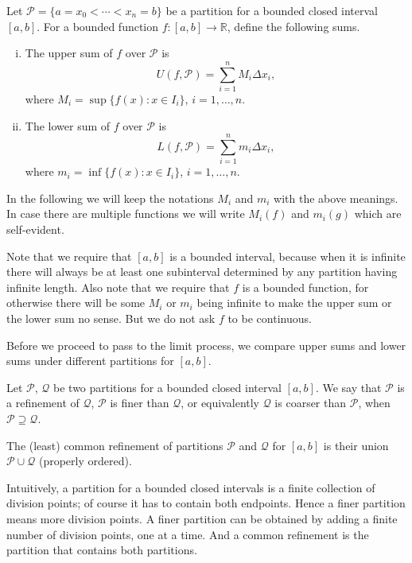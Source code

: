 \begin{defn}
  Let $\mathcal{P} = \{ a = x_0 < \cdots < x_n = b \}$ be a partition for a bounded closed interval $[a,b]$.
  For a bounded function $f: [a,b] \to \mathbb{R}$, define the following sums.
  \begin{enumerate}[(i)]
    \item The \textsf{upper sum} of $f$ over $\mathcal{P}$ is
    \[
      U(f,\mathcal{P}) = \sum_{i=1}^n M_i \Delta x_i,
    \]
    where $M_i = \sup \{ f(x) \colon x \in I_i \}$, $i = 1, \dots, n$.

    \item The \textsf{lower sum} of $f$ over $\mathcal{P}$ is
    \[
      L(f,\mathcal{P}) = \sum_{i=1}^n m_i \Delta x_i,
    \]
    where $m_i = \inf \{ f(x) \colon x \in I_i \}$, $i = 1, \dots, n$.
  \end{enumerate}
\end{defn}

In the following we will keep the notations $M_i$ and $m_i$ with the above meanings.  In case there are multiple functions we will write $M_i(f)$ and $m_i(g)$ which are self-evident.

Note that we require that $[a,b]$ is a bounded interval, because when it is infinite there will always be at least one subinterval determined by any partition having infinite length.
Also note that we require that $f$ is a bounded function, for otherwise there will be some $M_i$ or $m_i$ being infinite to make the upper sum or the lower sum no sense.
But we do not ask $f$ to be continuous.

Before we proceed to pass to the limit process, we compare upper sums and lower sums under different partitions for $[a,b]$.

\begin{defn}
  Let $\mathcal{P}$, $\mathcal{Q}$ be two partitions for a bounded closed interval $[a,b]$.
  We say that $\mathcal{P}$ is a \textsf{refinement} of $\mathcal{Q}$, $\mathcal{P}$ is \textsf{finer} than $\mathcal{Q}$, or equivalently $\mathcal{Q}$ is \textsf{coarser} than $\mathcal{P}$, when $\mathcal{P} \supseteq \mathcal{Q}$.

  The \textsf{(least) common refinement} of partitions $\mathcal{P}$ and $\mathcal{Q}$ for $[a,b]$ is their union $\mathcal{P} \cup \mathcal{Q}$ (properly ordered).
\end{defn}

Intuitively, a partition for a bounded closed intervals is a finite collection of division points; of course it has to contain both endpoints.
Hence a finer partition means more division points.
A finer partition can be obtained by adding a finite number of division points, one at a time.
And a common refinement is the partition that contains both partitions.

